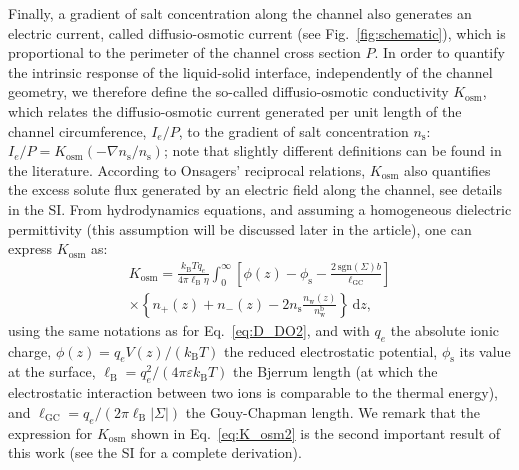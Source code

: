 \documentclass[journal=ancac3,manuscript=article,layout=twocolumn]{achemso}
\newcommand{\kt}{k_\text{B}T}
\newcommand{\eps}{\varepsilon}
\newcommand{\lB}{\ell_\text{B}}
\newcommand{\lGC}{\ell_\text{GC}}
\newcommand{\phis}{\phi_\text{s}}
\newcommand{\ns}{n_\text{s}}
\newcommand{\sgn}{\text{sgn}}
\begin{document}
Finally, a gradient of salt concentration along the channel also generates an electric current, called diffusio-osmotic current (see Fig.~\ref{fig:schematic}), which is proportional to the perimeter of the channel cross section $P$. In order to quantify the intrinsic response of the liquid-solid interface, independently of the channel geometry, we therefore define the so-called diffusio-osmotic conductivity $K_\text{osm}$, which relates the diffusio-osmotic current generated per unit length of the channel circumference, $I_e/P$, to the gradient of salt concentration $\ns$: $I_e/P = K_\text{osm} (-\nabla \ns / \ns)$; note that slightly different definitions can be found in the literature\cite{Siria2013,marbach2019osmosis}.
According to Onsagers' reciprocal relations, $K_\text{osm}$ also quantifies the excess solute flux
generated by an electric field along the channel, see details in the SI.
%
From hydrodynamics equations, and assuming a homogeneous dielectric permittivity (this assumption will be discussed later in the article),
one can express $K_\text{osm}$ as:
\begin{multline}\label{eq:K_osm2}
K_\text{osm} = \frac{\kt q_e}{4 \pi \lB \eta} \int_0^{\infty}  \left[ \phi(z) - \phis -  \frac{2 \, \sgn(\Sigma) b}{\lGC} \right] \\ \times
\left\{ n_+(z) + n_-(z) - 2 \ns \frac{n_\text{w}(z)}{n_\text{w}^\text{b}} \right\} \,\mathrm{d}z,
\end{multline}
using the same notations as for Eq.~\eqref{eq:D_DO2}, and with $q_e$ the absolute ionic charge, $\phi(z) = q_e V(z) / (k_\text{B}T)$ the reduced electrostatic potential, $\phis$ its value at the surface, $\lB = q_e^2/(4\pi\eps\kt)$ the Bjerrum length (at which the
electrostatic interaction between two ions is comparable to the thermal energy),
and $\lGC = q_e/(2\pi \lB |\Sigma|)$ the Gouy-Chapman length\cite{Herrero2021}.
We remark that the expression for $K_\text{osm}$ shown in Eq.~\eqref{eq:K_osm2}
is the second important result of this work (see the SI for a complete
derivation).
\end{document}
